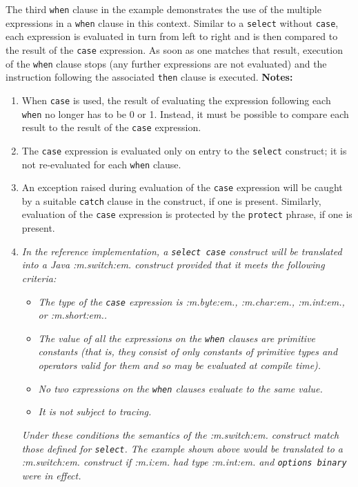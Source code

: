 The third \texttt{when} clause in the example demonstrates the use of the
multiple expressions in a \texttt{when} clause in this context.
Similar to a \texttt{select} without \texttt{case}, each
expression is evaluated in turn from left to right and is then
compared to the result of the \texttt{case} expression.
As soon as one matches that result, execution of the
\texttt{when} clause stops (any further expressions are not
evaluated) and the instruction following the associated
\texttt{then} clause is executed.
 \textbf{Notes:}
\begin{enumerate}
\item When \texttt{case} is used, the result of evaluating the expression
following each \texttt{when} no longer has to be 0 or 1.  Instead, it
must be possible to compare each result to the result of the
\texttt{case} expression.
\item 
The \texttt{case} expression is evaluated only on entry to the
\texttt{select} construct; it is not re-evaluated for each \texttt{when}
clause.
\item 
An exception raised during evaluation of the \texttt{case} expression
will be caught by a suitable \texttt{catch} clause in the construct, if
one is present.
Similarly, evaluation of the \texttt{case} expression is protected by
the \texttt{protect} phrase, if one is present.
\item 
\emph{In the reference implementation, a \texttt{select case} construct will
be translated into a Java :m.switch:em. construct provided that it
meets the following criteria:}
\begin{itemize}
\item 
\emph{The type of the \texttt{case} expression
is :m.byte:em., :m.char:em., :m.int:em., or :m.short:em..}
\item 
\emph{The value of all the expressions on the \texttt{when} clauses are
primitive constants (that is, they consist of only constants of
primitive types and operators valid for them and so may be evaluated at
compile time).}
\item 
\emph{No two expressions on the \texttt{when} clauses evaluate to the same
value.}
\item 
\emph{It is not subject to tracing.}
\end{itemize}
\emph{Under these conditions the semantics of the :m.switch:em. construct
match those defined for \texttt{select}.  The example shown above would
be translated to a :m.switch:em. construct if :m.i:em. had type :m.int:em.
and \texttt{options binary} were in effect.}
\end{enumerate}
